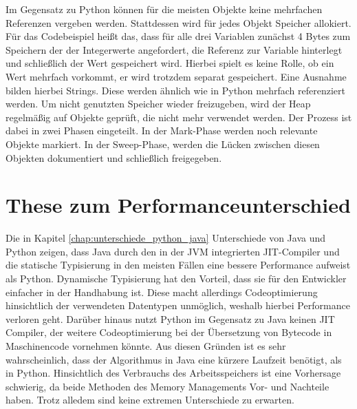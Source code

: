 Im Gegensatz zu Python können für die meisten Objekte keine mehrfachen Referenzen vergeben werden. Stattdessen wird für jedes 
Objekt Speicher allokiert. Für das Codebeispiel heißt das, dass für alle drei Variablen zunächst 4 Bytes zum Speichern der 
der Integerwerte angefordert, die Referenz zur Variable hinterlegt und schließlich der Wert gespeichert wird. Hierbei spielt 
es keine Rolle, ob ein Wert mehrfach vorkommt, er wird trotzdem separat gespeichert. Eine Ausnahme bilden hierbei Strings. 
Diese werden ähnlich wie in Python mehrfach referenziert werden. Um nicht genutzten Speicher wieder freizugeben, wird der Heap 
regelmäßig auf Objekte geprüft, die nicht mehr verwendet werden. Der Prozess ist dabei in zwei Phasen eingeteilt. In der Mark-Phase 
werden noch relevante Objekte markiert. In der Sweep-Phase, werden die Lücken zwischen diesen Objekten dokumentiert und schließlich 
freigegeben.\autocite[Vgl.][]{OracleGC.2021}

\section{These zum Performanceunterschied}

Die in Kapitel \ref{chap:unterschiede_python_java} Unterschiede von Java und Python zeigen, dass Java durch den in der JVM integrierten 
JIT-Compiler und die statische Typisierung in den meisten Fällen eine bessere Performance aufweist als Python. 
Dynamische Typisierung hat den Vorteil, dass sie für den Entwickler einfacher in der Handhabung ist. Diese macht allerdings 
Codeoptimierung hinsichtlich der verwendeten Datentypen unmöglich, weshalb hierbei Performance verloren geht. Darüber 
hinaus nutzt Python im Gegensatz zu Java keinen JIT Compiler, der weitere Codeoptimierung bei der Übersetzung von Bytecode in Maschinencode 
vornehmen könnte. Aus diesen Gründen ist es sehr wahrscheinlich, dass der Algorithmus in Java eine kürzere Laufzeit benötigt, als 
in Python. Hinsichtlich des Verbrauchs des Arbeitsspeichers ist eine Vorhersage schwierig, da beide Methoden des Memory Managements 
Vor- und Nachteile haben. Trotz alledem sind keine extremen Unterschiede zu erwarten.